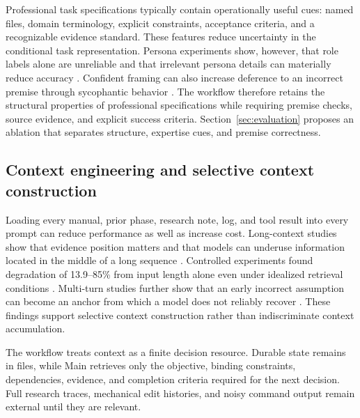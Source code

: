 \documentclass[11pt,a4paper]{article}
\begin{document}
Professional task specifications typically contain operationally useful cues: named files, domain terminology, explicit constraints, acceptance criteria, and a recognizable evidence standard. These features reduce uncertainty in the conditional task representation. Persona experiments show, however, that role labels alone are unreliable and that irrelevant persona details can materially reduce accuracy \cite{zheng2024persona,luz2025persona}. Confident framing can also increase deference to an incorrect premise through sycophantic behavior \cite{sharma2023,wei2023sycophancy}. The workflow therefore retains the structural properties of professional specifications while requiring premise checks, source evidence, and explicit success criteria. Section~\ref{sec:evaluation} proposes an ablation that separates structure, expertise cues, and premise correctness.

\subsection{Context engineering and selective context construction}\label{sec:context-rationale}

Loading every manual, prior phase, research note, log, and tool result into every prompt can reduce performance as well as increase cost. Long-context studies show that evidence position matters and that models can underuse information located in the middle of a long sequence \cite{liu2024}. Controlled experiments found degradation of 13.9--85\% from input length alone even under idealized retrieval conditions \cite{du2025context}. Multi-turn studies further show that an early incorrect assumption can become an anchor from which a model does not reliably recover \cite{laban2025multiturn}. These findings support selective context construction rather than indiscriminate context accumulation.

The workflow treats context as a finite decision resource. Durable state remains in files, while Main retrieves only the objective, binding constraints, dependencies, evidence, and completion criteria required for the next decision. Full research traces, mechanical edit histories, and noisy command output remain external until they are relevant.
\end{document}
